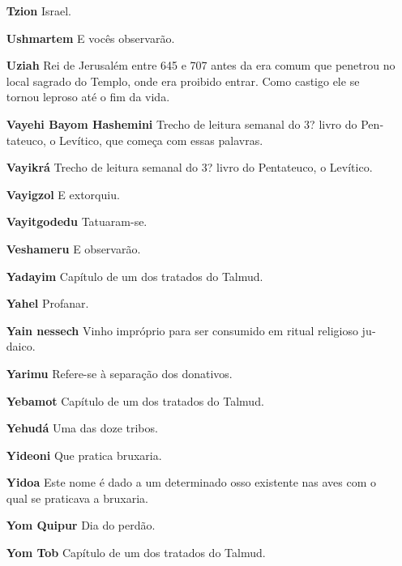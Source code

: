 \begin{itemize}
\item[\textbf{Tzion}] Israel.

\item[\textbf{Ushmartem}] E vocês observarão.

\item[\textbf{Uziah}] Rei de Jerusalém entre 645 e 707 antes da era comum que penetrou no local
sagrado do Templo, onde era proibido entrar. Como castigo ele se tornou
leproso até o fim da vida.

\item[\textbf{Vayehi Bayom Hashemini}] Trecho de
leitura semanal do 3? livro do Pen­tateuco, o Levítico, que começa com
essas palavras.

\item[\textbf{Vayikrá}] Trecho de leitura semanal do 3? livro do Pentateuco,
o Levítico.

\item[\textbf{Vayigzol}] E extorquiu.

\item[\textbf{Vayitgodedu}] Tatuaram-se.

\item[\textbf{Veshameru}] E observarão.

\item[\textbf{Yadayim}] Capítulo de um dos trata­dos do Talmud.

\item[\textbf{Yahel}] Profanar.

\item[\textbf{Yain nessech}] Vinho impróprio pa­ra ser consumido em ritual
religioso ju­daico.

\item[\textbf{Yarimu}] Refere-se à separação dos donativos.

\item[\textbf{Yebamot}] Capítulo de um dos trata­dos do Talmud.

\item[\textbf{Yehudá}] Uma das doze tribos. 

\item[\textbf{Yideoni}] Que pratica bruxaria.

\item[\textbf{Yidoa}] Este nome é dado a um deter­minado osso
existente nas aves com o qual se praticava a bruxaria.

\item[\textbf{Yom Quipur}] Dia do perdão. 

\item[\textbf{Yom Tob}] Capítulo de um dos trata­dos do Talmud.


\end{itemize}

